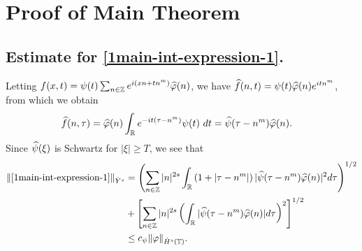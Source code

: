 \section{Proof of Main Theorem}
%
%
%
%
%
%
%
%
%
%
%
\subsection{Estimate for \eqref{1main-int-expression-1}.}
%
%
Letting $f(x,t) = \psi(t) \sum_{n \in \mathbb{Z}} e^{i(xn + tn^m)} 
\widehat{\varphi}(n)$, we have $\widehat{f}(n,t) = \psi(t) \widehat{\varphi}(n) e^{itn^m}$,
from which we obtain
%
%
\begin{equation}
	\label{1fourier-trans-calc}
	\begin{split}
		\widehat{f}(n, \tau)
		& = \widehat{\varphi}(n) \int_{\mathbb{R}} e^{-it( \tau - n^m)} 
		\psi(t) \ d t
		= \widehat{\psi}(\tau - n^m) \widehat{\varphi}(n).
	\end{split}
\end{equation}
%
%
%
%
%
%
Since $\widehat{\psi}(\xi)$ is Schwartz for $|\xi| \ge T$, we see that 
%
%
\begin{equation}
	\begin{split}
	\label{1main-int1-est}
		\|\eqref{1main-int-expression-1}\|_{\dot{Y}^s}
		& = \left (  \sum_{n\in \mathbb{Z}} |n|^{2s} \int_{\mathbb{R}} \left( 1 + | \tau - n^m 
		| \right )
		| \widehat{\psi}(\tau - n^m) \widehat{\varphi}(n) |^2 d \tau \right)^{1/2} 
		\\
		& + \left[ \sum_{n \in \mathbb{Z} }| n |^{2s} \left( \int_{\mathbb{R}} |
		\widehat{\psi}(\tau - n^m)\widehat{\varphi}(n) | d \tau
		\right)^{2} \right]^{1/2}
		\\
		& \le c_{\psi}
		\|\varphi\|_{\dot{H}^s(\mathbb{T})}.
	\end{split}
\end{equation}
%
%
%
%
